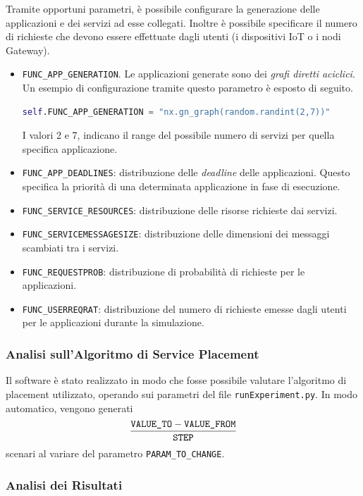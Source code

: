 Tramite opportuni parametri, è possibile configurare la generazione delle applicazioni e dei servizi ad esse collegati. Inoltre è possibile specificare il numero di richieste che devono essere effettuate dagli utenti (i dispositivi IoT o i nodi Gateway). 
\begin{itemize}
	\item \texttt{FUNC\_APP\_GENERATION}. Le applicazioni generate sono dei \textit{grafi diretti aciclici}. Un esempio di configurazione tramite questo parametro è esposto di seguito.
		\begin{lstlisting}[language=python]
self.FUNC_APP_GENERATION = "nx.gn_graph(random.randint(2,7))"\end{lstlisting}
		I valori 2 e 7, indicano il range del possibile numero di servizi per quella specifica applicazione.
	\item \texttt{FUNC\_APP\_DEADLINES}: distribuzione delle \textit{deadline} delle applicazioni. Questo specifica la priorità di una determinata applicazione in fase di esecuzione.
	\item \texttt{FUNC\_SERVICE\_RESOURCES}: distribuzione delle risorse richieste dai servizi.
	\item \texttt{FUNC\_SERVICEMESSAGESIZE}: distribuzione delle dimensioni dei messaggi scambiati tra i servizi.
	\item \texttt{FUNC\_REQUESTPROB}: distribuzione di probabilità di richieste per le applicazioni.
	\item \texttt{FUNC\_USERREQRAT}: distribuzione del numero di richieste emesse dagli utenti per le applicazioni durante la simulazione.
\end{itemize}

\subsubsection{Analisi sull'Algoritmo di Service Placement}
Il software è stato realizzato in modo che fosse possibile valutare l'algoritmo di placement utilizzato, operando sui parametri del file \texttt{runExperiment.py}. In modo automatico, vengono generati 
		$$\frac{\text{\texttt{VALUE\_TO}} - \text{\texttt{VALUE\_FROM}}}{\text{\texttt{STEP}}}$$
scenari al variare del parametro \texttt{PARAM\_TO\_CHANGE}.

\subsubsection{Analisi dei Risultati}

